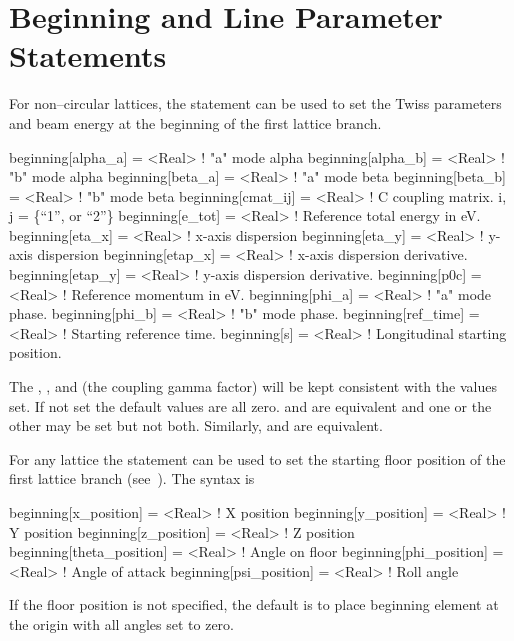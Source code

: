 \section{Beginning and Line Parameter Statements}
\label{s:beginning}

For non--circular lattices, the  statement can be used to
set the Twiss parameters and beam energy at the beginning of the first lattice branch.
\begin{example}
  beginning[alpha_a]  = <Real>  ! "a" mode alpha
  beginning[alpha_b]  = <Real>  ! "b" mode alpha
  beginning[beta_a]   = <Real>  ! "a" mode beta
  beginning[beta_b]   = <Real>  ! "b" mode beta
  beginning[cmat_ij]  = <Real>  ! C coupling matrix. i, j = \{``1'', or ``2''\} 
  beginning[e_tot]    = <Real>  ! Reference total energy in eV.
  beginning[eta_x]    = <Real>  ! x-axis dispersion
  beginning[eta_y]    = <Real>  ! y-axis dispersion
  beginning[etap_x]   = <Real>  ! x-axis dispersion derivative.
  beginning[etap_y]   = <Real>  ! y-axis dispersion derivative.
  beginning[p0c]      = <Real>  ! Reference momentum in eV.
  beginning[phi_a]    = <Real>  ! "a" mode phase.
  beginning[phi_b]    = <Real>  ! "b" mode phase.
  beginning[ref_time] = <Real>  ! Starting reference time.
  beginning[s]        = <Real>  ! Longitudinal starting position.
\end{example}
The , , and  (the coupling gamma
factor) will be kept consistent with the values set. If not set the
default values are all zero.   and
 are equivalent and one or the other may be
set but not both. Similarly,  and
 are equivalent.

For any lattice the  statement can be used to set the
starting floor position of the first lattice branch
(see~). The syntax is
\begin{example}
  beginning[x_position]     = <Real>  ! X position
  beginning[y_position]     = <Real>  ! Y position
  beginning[z_position]     = <Real>  ! Z position
  beginning[theta_position] = <Real>  ! Angle on floor
  beginning[phi_position]   = <Real>  ! Angle of attack
  beginning[psi_position]   = <Real>  ! Roll angle
\end{example}
If the floor position is not specified, the default is to place
beginning element at the origin with all angles set to zero.

